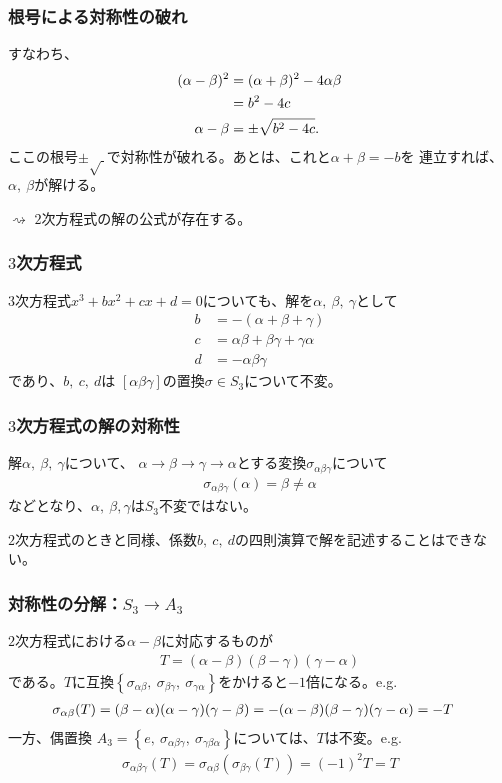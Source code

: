\documentclass[12pt, t]{beamer}
\newcommand{\slr}[1]{\left[{}#1\right]{}}
\newcommand{\clr}[1]{\left\{{}#1\right\}{}}
\begin{document}
\begin{frame}
\frametitle{根号による対称性の破れ}
すなわち、
\begin{align}
  (\alpha - \beta)^2 &= (\alpha + \beta)^2 - 4 \alpha \beta \notag \\
                     &= b^2 - 4 c \\
  \alpha - \beta &= \pm \sqrt{b^2 - 4 c}.
\end{align}
ここの根号$\pm \sqrt{\ }$で\alert{対称性が破れる}。あとは、これと$\alpha + \beta = -b$を
連立すれば、$\alpha,\ \beta$が解ける。

$\rightsquigarrow$ $2$次方程式の解の公式が存在する。
\end{frame}

\begin{frame}
\frametitle{$3$次方程式}
$3$次方程式$x^3+bx^2+cx+d=0$についても、解を$\alpha,\ \beta,\ \gamma$として
\begin{align}
  b &= -(\alpha + \beta + \gamma) \\
  c &= \alpha \beta + \beta \gamma + \gamma \alpha \\
  d &= -\alpha \beta \gamma
\end{align}
であり、$b,\ c,\ d$は $\slr{\alpha \beta \gamma}$の置換$\sigma \in S_3$について不変。
\end{frame}

\begin{frame}
\frametitle{$3$次方程式の解の対称性}
解$\alpha,\ \beta,\ \gamma$について、
$\alpha \rightarrow \beta \rightarrow \gamma \rightarrow \alpha$とする変換$\sigma_{\alpha \beta \gamma}$について
\begin{align}
  \sigma_{\alpha \beta \gamma}(\alpha) = \beta \neq \alpha
\end{align}
などとなり、$\alpha,\ \beta, \gamma$は$S_3$不変ではない。

$2$次方程式のときと同様、係数$b,\ c,\ d$の四則演算で解を記述することはできない。
\end{frame}

\begin{frame}
\frametitle{対称性の分解：$S_3 \rightarrow A_3$}
$2$次方程式における$\alpha - \beta$に対応するものが
\begin{align}
  T = (\alpha - \beta)(\beta - \gamma)(\gamma - \alpha)
\end{align}
である。$T$に互換$\clr{\sigma_{\alpha \beta},\ \sigma_{\beta \gamma},\ \sigma_{\gamma \alpha}}$をかけると$-1$倍になる。e.g.
\begin{align}
  \sigma_{\alpha \beta}(T) &= (\beta - \alpha)(\alpha - \gamma)(\gamma - \beta) = -(\alpha - \beta)(\beta - \gamma)(\gamma - \alpha) = -T \notag
\end{align}
一方、偶置換 $A_3 = \clr{e,\ \sigma_{\alpha \beta \gamma},\ \sigma_{\gamma \beta \alpha}}$については、$T$は不変。e.g.
\begin{align}
  \sigma_{\alpha \beta \gamma}(T) = \sigma_{\alpha \beta}(\sigma_{\beta \gamma}(T)) = (-1)^2 T = T
\end{align}
\end{frame}
\end{document}
